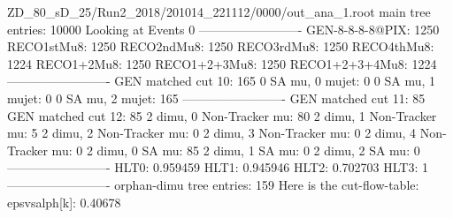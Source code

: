 ZD_80_sD_25/Run2_2018/201014_221112/0000/out_ana_1.root
main tree entries: 10000
Looking at Events 0
-------------------------
GEN-8-8-8-8@PIX: 1250
RECO1stMu8: 1250
RECO2ndMu8: 1250
RECO3rdMu8: 1250
RECO4thMu8: 1224
RECO1+2Mu8: 1250
RECO1+2+3Mu8: 1250
RECO1+2+3+4Mu8: 1224
-------------------------
GEN matched cut 10: 165
0 SA mu, 0 mujet: 0
0 SA mu, 1 mujet: 0
0 SA mu, 2 mujet: 165
-------------------------
GEN matched cut 11: 85
GEN matched cut 12: 85
2 dimu, 0 Non-Tracker mu: 80
2 dimu, 1 Non-Tracker mu: 5
2 dimu, 2 Non-Tracker mu: 0
2 dimu, 3 Non-Tracker mu: 0
2 dimu, 4 Non-Tracker mu: 0
2 dimu, 0 SA mu: 85
2 dimu, 1 SA mu: 0
2 dimu, 2 SA mu: 0
-------------------------
HLT0: 0.959459
HLT1: 0.945946
HLT2: 0.702703
HLT3: 1
-------------------------
orphan-dimu tree entries: 159
Here is the cut-flow-table:
epsvsalph[k]: 0.40678
        
